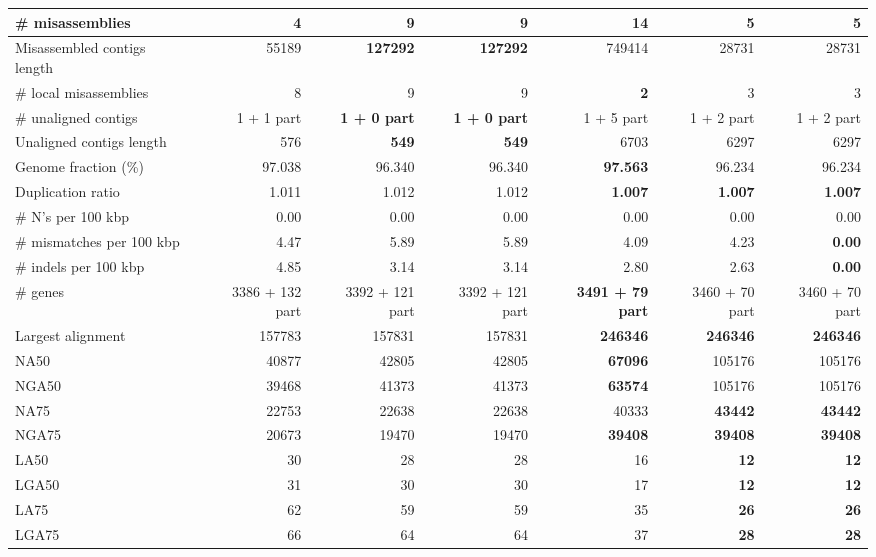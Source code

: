\documentclass[12pt,a4paper]{article}
\begin{document}
\begin{table}[ht]
\begin{center}
\begin{tabular}{|l*{6}{|r}|}
\# misassemblies & 4 & 9 & 9 & {\bf 14} & 5 & 5 \\ \hline
Misassembled contigs length & 55189 & {\bf 127292} & {\bf 127292} & 749414 & 28731 & 28731 \\ \hline
\# local misassemblies & 8 & 9 & 9 & {\bf 2} & 3 & 3 \\ \hline
\# unaligned contigs & 1 + 1 part & {\bf 1 + 0 part} & {\bf 1 + 0 part} & 1 + 5 part & 1 + 2 part & 1 + 2 part \\ \hline
Unaligned contigs length & 576 & {\bf 549} & {\bf 549} & 6703 & 6297 & 6297 \\ \hline
Genome fraction (\%) & 97.038 & 96.340 & 96.340 & {\bf 97.563} & 96.234 & 96.234 \\ \hline
Duplication ratio & 1.011 & 1.012 & 1.012 & {\bf 1.007} & {\bf 1.007} & {\bf 1.007} \\ \hline
\# N's per 100 kbp & 0.00 & 0.00 & 0.00 & 0.00 & 0.00 & 0.00 \\ \hline
\# mismatches per 100 kbp & 4.47 & 5.89 & 5.89 & 4.09 & 4.23 & {\bf 0.00} \\ \hline
\# indels per 100 kbp & 4.85 & 3.14 & 3.14 & 2.80 & 2.63 & {\bf 0.00} \\ \hline
\# genes & 3386 + 132 part & 3392 + 121 part & 3392 + 121 part & {\bf 3491 + 79 part} & 3460 + 70 part & 3460 + 70 part \\ \hline
Largest alignment & 157783 & 157831 & 157831 & {\bf 246346} & {\bf 246346} & {\bf 246346} \\ \hline
NA50 & 40877 & 42805 & 42805 & {\bf 67096} & 105176 & 105176 \\ \hline
NGA50 & 39468 & 41373 & 41373 & {\bf 63574} & 105176 & 105176 \\ \hline
NA75 & 22753 & 22638 & 22638 & 40333 & {\bf 43442} & {\bf 43442} \\ \hline
NGA75 & 20673 & 19470 & 19470 & {\bf 39408} & {\bf 39408} & {\bf 39408} \\ \hline
LA50 & 30 & 28 & 28 & 16 & {\bf 12} & {\bf 12} \\ \hline
LGA50 & 31 & 30 & 30 & 17 & {\bf 12} & {\bf 12} \\ \hline
LA75 & 62 & 59 & 59 & 35 & {\bf 26} & {\bf 26} \\ \hline
LGA75 & 66 & 64 & 64 & 37 & {\bf 28} & {\bf 28} \\ \hline
\end{tabular}
\end{center}
\end{table}
\end{document}
